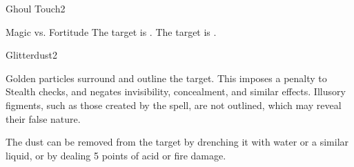 \begin{spellsection}{Ghoul Touch}{2}
\begin{spellheader}
\end{spellheader}
\begin{spellcontent}
    \begin{spelltargetinginfo}
    \end{spelltargetinginfo}
    \begin{spelleffects}
        \begin{spellattack}{Magic vs. Fortitude}
            \spellsuccess The target is \staggered.
            \spellfailure The target is \sickened.
        \end{spellattack}
        \spelldur \durshort
    \end{spelleffects}
\end{spellcontent}
\begin{spellfooter}
\end{spellfooter}
\end{spellsection}

\begin{spellsection}{Glitterdust}{2}
\begin{spellheader}
\end{spellheader}
\begin{spellcontent}
    \begin{spelltargetinginfo}
    \end{spelltargetinginfo}
    \begin{spelleffects}
        \spelleffect Golden particles surround and outline the target. This imposes a  penalty to Stealth checks, and negates invisibility, concealment, and similar effects. Illusory figments, such as those created by the  spell, are not outlined, which may reveal their false nature.

        The dust can be removed from the target by drenching it with water or a similar liquid, or by dealing 5 points of acid or fire damage.
        \spelldur \durshort
    \end{spelleffects}
\end{spellcontent}
\begin{spellfooter}
\end{spellfooter}
\end{spellsection}

